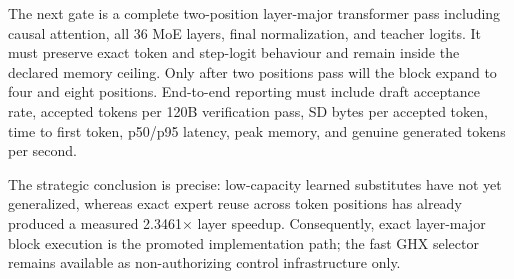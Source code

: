 The next gate is a complete two-position layer-major transformer pass including
causal attention, all 36 MoE layers, final normalization, and teacher logits.
It must preserve exact token and step-logit behaviour and remain inside the
declared memory ceiling.  Only after two positions pass will the block expand
to four and eight positions.  End-to-end reporting must include draft
acceptance rate, accepted tokens per 120B verification pass, SD bytes per
accepted token, time to first token, p50/p95 latency, peak memory, and genuine
generated tokens per second.

The strategic conclusion is precise: low-capacity learned substitutes have not
yet generalized, whereas exact expert reuse across token positions has already
produced a measured 2.3461$\times$ layer speedup.  Consequently, exact
layer-major block execution is the promoted implementation path; the fast GHX
selector remains available as non-authorizing control infrastructure only.
